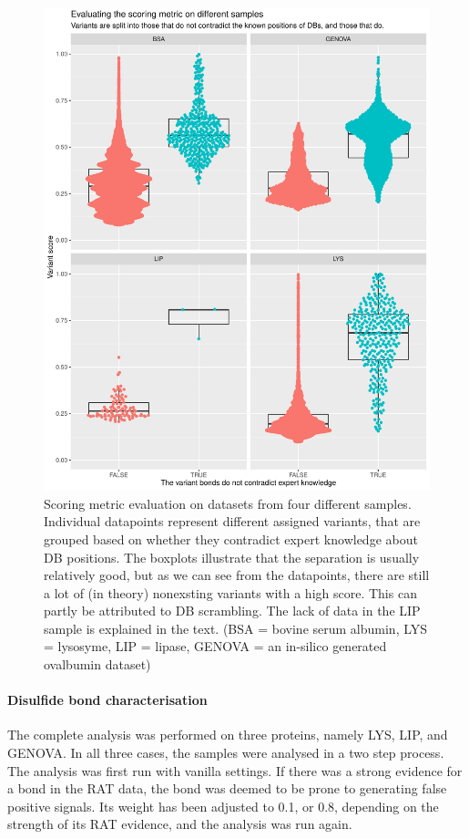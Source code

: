 \begin{figure}
  \centering
  \includegraphics[width=1\linewidth]{img/scoring-metric-evaluation.pdf}
  \caption{Scoring metric evaluation on datasets from four different samples. Individual datapoints represent different assigned variants, that are grouped based on whether they contradict expert knowledge about DB positions. The boxplots illustrate that the separation is usually relatively good, but as we can see from the datapoints, there are still a lot of (in theory) nonexsting variants with a high score. This can partly be attributed to DB scrambling. The lack of data in the LIP sample is explained in the text. (BSA = bovine serum albumin, LYS = lysosyme, LIP = lipase, GENOVA = an in-silico generated ovalbumin dataset)}\label{fig:scoring-metric}
\end{figure}


\paragraph{Disulfide bond characterisation} The complete analysis was performed on three proteins, namely LYS, LIP, and GENOVA\@. In all three cases, the samples were analysed in a two step process. The analysis was first run with vanilla settings. If there was a strong evidence for a bond in the RAT data, the bond was deemed to be prone to generating false positive signals. Its weight has been adjusted to 0.1, or 0.8, depending on the strength of its RAT evidence, and the analysis was run again.

